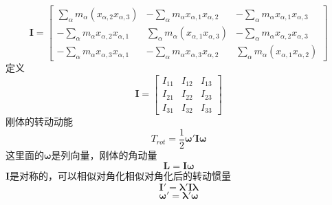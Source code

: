 \documentclass{article}
\begin{document}
\begin{equation}
  \label{eq:121}
  \mathbf{I} = \left[ \begin{array}{ccc}
                       \sum\limits_{\alpha} m_{\alpha} \left( x_{\alpha ,2} x_{\alpha ,3} \right) & - \sum\limits_{\alpha} m_{\alpha} x_{\alpha ,1} x_{\alpha, 2} & - \sum\limits_{\alpha} m_{\alpha} x_{\alpha ,1} x_{\alpha, 3}\\
                       - \sum\limits_{\alpha} m_{\alpha} x_{\alpha ,2} x_{\alpha, 1} & \sum\limits_{\alpha} m_{\alpha} \left( x_{\alpha ,1} x_{\alpha ,3} \right) & - \sum\limits_{\alpha} m_{\alpha} x_{\alpha ,2} x_{\alpha, 3}\\
                       - \sum\limits_{\alpha} m_{\alpha} x_{\alpha ,3} x_{\alpha, 1} & - \sum\limits_{\alpha} m_{\alpha} x_{\alpha ,3} x_{\alpha, 2} & \sum\limits_{\alpha} m_{\alpha} \left( x_{\alpha ,1} x_{\alpha ,2} \right)
                      \end{array} \right ] 
\end{equation}
定义
\begin{equation}
  \label{eq:122}
  \mathbf{I} = \left[
    \begin{array}{ccc}
                       I_{11} & I_{12} & I_{13} \\
		    I_{21} & I_{22} & I_{23} \\
		    I_{31} & I_{32} & I_{33}

    \end{array} \right ]
\end{equation}
刚体的转动动能
\begin{equation}
  \label{eq:123}
  T_{rot} = \dfrac{1}{2} \mathbf{\omega}' \mathbf{I} \mathbf{\omega}
\end{equation}
这里面的$\mathbf{\omega}$是列向量，刚体的角动量
\begin{equation}
  \label{eq:124}
  \mathbf{L} = \mathbf{I} \mathbf{\omega}
\end{equation}
$\mathbf{I}$是对称的，可以相似对角化相似对角化后的转动惯量
\begin{equation}
  \label{eq:125}
  \mathbf{I'} = \mathbf{\lambda}' \mathbf{I} \mathbf{\lambda}
\end{equation}
\begin{equation}
  \label{eq:126}
  \mathbf{\omega}' =  \mathbf{\lambda}' \mathbf{\omega}
\end{equation}
\end{document}
